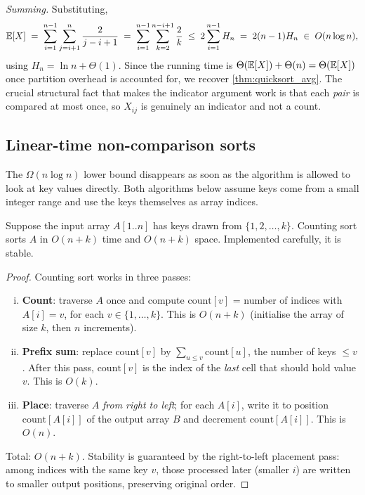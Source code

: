 \begin{example}
\medskip
\noindent\textit{Summing.} Substituting,
\[
  \operatorname{\mathbb{E}}[X] \;=\; \sum_{i=1}^{n-1}\sum_{j=i+1}^{n} \frac{2}{j - i + 1}
            \;=\; \sum_{i=1}^{n-1} \sum_{k=2}^{n - i + 1} \frac{2}{k}
            \;\le\; 2\sum_{i=1}^{n-1} H_n
            \;=\; 2(n-1) H_n
            \;\in\; O(n \log n),
\]
using $H_n = \ln n + \Theta(1)$. Since the running time is $\Theta(\operatorname{\mathbb{E}}[X]) + \Theta(n) = \Theta(\operatorname{\mathbb{E}}[X])$ once partition overhead is accounted for, we recover \cref{thm:quicksort_avg}. The crucial structural fact that makes the indicator argument work is that each \emph{pair} is compared at most once, so $X_{ij}$ is genuinely an indicator and not a count.
\end{example}

\subsection{Linear-time non-comparison sorts}

The $\Omega(n \log n)$ lower bound disappears as soon as the algorithm is allowed to look at key values directly. Both algorithms below assume keys come from a small integer range and use the keys themselves as array indices.

\begin{theorem}
\label{thm:counting_sort}
Suppose the input array $A[1..n]$ has keys drawn from $\{1, 2, \dots, k\}$. Counting sort sorts $A$ in $O(n + k)$ time and $O(n + k)$ space. Implemented carefully, it is stable.
\end{theorem}

\begin{proof}
Counting sort works in three passes:
\begin{enumerate}[(i)]
  \item \textbf{Count}: traverse $A$ once and compute $\mathrm{count}[v]$ = number of indices with $A[i] = v$, for each $v \in \{1, \dots, k\}$. This is $O(n + k)$ (initialise the array of size $k$, then $n$ increments).
  \item \textbf{Prefix sum}: replace $\mathrm{count}[v]$ by $\sum_{u \le v} \mathrm{count}[u]$, the number of keys $\le v$. After this pass, $\mathrm{count}[v]$ is the index of the \emph{last} cell that should hold value $v$. This is $O(k)$.
  \item \textbf{Place}: traverse $A$ \emph{from right to left}; for each $A[i]$, write it to position $\mathrm{count}[A[i]]$ of the output array $B$ and decrement $\mathrm{count}[A[i]]$. This is $O(n)$.
\end{enumerate}
Total: $O(n + k)$. Stability is guaranteed by the right-to-left placement pass: among indices with the same key $v$, those processed later (smaller $i$) are written to smaller output positions, preserving original order.
\end{proof}

